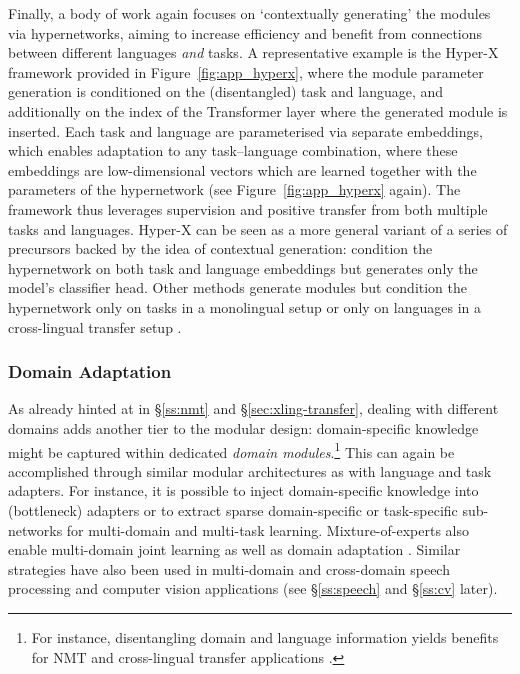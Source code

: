 \documentclass[10pt]{article} %
\begin{document}
Finally, a body of work again focuses on `contextually generating' the modules via hypernetworks, aiming to increase efficiency and benefit from connections between different languages \textit{and} tasks. A representative example is the Hyper-X framework \citep{Ustun:2022hyperx} provided in Figure~\ref{fig:app_hyperx}, where the module parameter generation is conditioned on the (disentangled) task and language, and additionally on the index of the Transformer layer where the generated module is inserted. Each task and language are parameterised via separate embeddings, which enables adaptation to any task--language combination, where these embeddings are low-dimensional vectors which are learned together with the parameters of the hypernetwork (see Figure~\ref{fig:app_hyperx} again). The framework thus leverages supervision and positive transfer from both multiple tasks and languages. Hyper-X can be seen as a more general variant of a series of precursors backed by the idea of contextual generation: \citet{ponti-etal-2021-parameter} condition the hypernetwork on both task and language embeddings but generates only the model's classifier head. Other methods generate modules but condition the hypernetwork only on tasks in a monolingual setup \citep{mahabadi2021parameter} or only on languages in a cross-lingual transfer setup \citep{Ustun2020,Ansell2021MADG}.

 
\subsubsection{Domain Adaptation}
\label{sec:domain_adap}
As already hinted at in \S\ref{ss:nmt} and \S\ref{sec:xling-transfer}, dealing with different domains adds another tier to the modular design: domain-specific knowledge might be captured within dedicated \textit{domain modules}.\footnote{For instance, disentangling domain and language information yields benefits for NMT and cross-lingual transfer applications \citep{vilar-2018-learning,cooper-stickland-etal-2021-multilingual,pham-etal-2021-revisiting,Saunders:2022survey}.} This can again be accomplished through similar modular architectures as with language and task adapters. For instance, it is possible to inject domain-specific knowledge into (bottleneck) adapters \citep{Zhang:2021ws,Chronopoulou2022EfficientHierarchical} or to extract sparse domain-specific or task-specific sub-networks \citep{Thompson:2018nmt,ke-etal-2021-adapting} for multi-domain and multi-task learning. Mixture-of-experts also enable multi-domain joint learning as well as domain adaptation \citep{Guo:2018emnlp,Zhang:2022metadmoe}. Similar strategies have also been used in multi-domain and cross-domain speech processing and computer vision applications (see \S\ref{ss:speech} and \S\ref{ss:cv} later).
\end{document}
